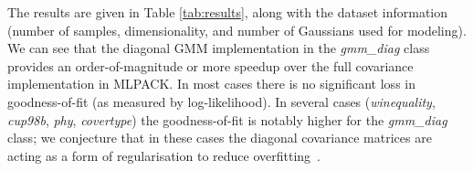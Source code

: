 The results are given in Table \ref{tab:results}, along with the dataset
information (number of samples, dimensionality, and number of Gaussians
used for modeling).  We can see that the diagonal GMM implementation in 
the {\it gmm\_diag} class provides an order-of-magnitude or more speedup over the full covariance
implementation in MLPACK.
In most cases there is no significant loss in goodness-of-fit (as measured by log-likelihood).
In several cases ({\it winequality}, {\it cup98b}, {\it phy}, {\it covertype})
the goodness-of-fit is notably higher for the {\it gmm\_diag} class;
we conjecture that in these cases the diagonal covariance matrices are acting as a form of regularisation to reduce overfitting~\cite{Bishop_2006}.



% 

